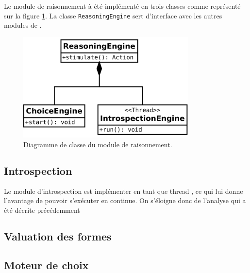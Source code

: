 
Le module de raisonnement à été implémenté en trois classes comme représenté sur la figure \ref{class_diag_reasoning_engine}. La classe \texttt{ReasoningEngine} sert d'interface avec les autres modules de \cogito{}. 

\begin{figure}[H] 
\center
\includegraphics[width=0.8\textwidth]{files/class_diagram/reasoningEngine} 
\caption{Diagramme de classe du module de raisonnement.}
\label{class_diag_reasoning_engine}
\end{figure}

\subsection{Introspection}


Le module d'introspection est implémenter en tant que \og thread \fg{}, ce qui lui donne l'avantage de pouvoir s'exécuter en continue. On s'éloigne donc de l'analyse qui a été décrite précédemment  


\subsection{Valuation des formes}



\subsection{Moteur de choix}
